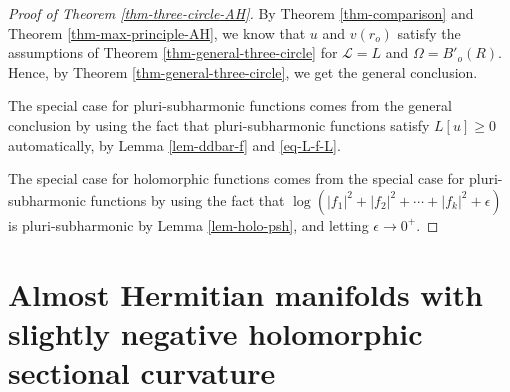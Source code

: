 \documentclass[12pt]{amsart}
\def\e{\epsilon}
\theoremstyle{definition}
\theoremstyle{remark}
\numberwithin{equation}{section}
\begin{document}
\begin{proof}[Proof of Theorem \ref{thm-three-circle-AH}]
By Theorem \ref{thm-comparison} and Theorem \ref{thm-max-principle-AH}, we know that $u$ and $v(r_o)$ satisfy the assumptions of Theorem \ref{thm-general-three-circle} for $\mathscr L=L$ and $\Omega=B'_o(R)$. Hence, by Theorem \ref{thm-general-three-circle}, we get the general conclusion.

The special case for pluri-subharmonic functions comes from the general conclusion by using the fact that pluri-subharmonic functions satisfy $L[u]\geq 0$ automatically, by Lemma \ref{lem-ddbar-f} and \eqref{eq-L-f-L}.

The special case for holomorphic functions comes from the special case for pluri-subharmonic functions by using the fact that $\log (|f_1|^2+|f_2|^2+\cdots+|f_k|^2+\e)$ is pluri-subharmonic by Lemma \ref{lem-holo-psh}, and letting $\e\to 0^+$.
\end{proof}
\section{Almost Hermitian manifolds with slightly negative holomorphic sectional curvature}
\end{document}
